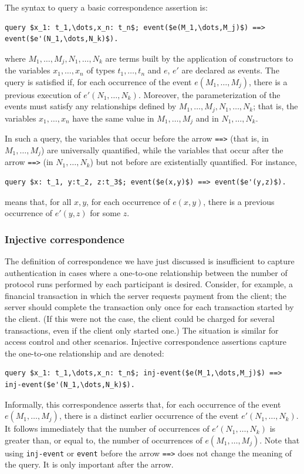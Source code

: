 \documentclass{book}
\begin{document}
The syntax to query a basic correspondence assertion is:
%
\begin{lstlisting}[numbers=none]
	query $x_1: t_1,\dots,x_n: t_n$; event($e(M_1,\dots,M_j)$) ==> event($e'(N_1,\dots,N_k)$).
\end{lstlisting}
%
where $M_1,\ldots,M_j,N_1,\ldots,N_k$ are terms built by the application of constructors to the variables $x_1,\allowbreak \ldots,\allowbreak x_n$ of types $t_1,\ldots,t_n$ and $e$, $e'$ are declared as events. The query is satisfied if, for each occurrence of the event $e(M_1,\dots,M_j)$, there is a previous execution of $e'(N_1,\dots,N_k)$. Moreover, the parameterization of the events must satisfy any relationships defined by $M_1,\dots,\allowbreak M_j,\allowbreak N_1,\dots,\allowbreak N_k$; that is, the variables $x_1, \ldots, x_n$ have the same value in $M_1,\dots,M_j$ and in $N_1,\dots,N_k$.

In such a query, the variables that occur before the arrow \lstinline!==>! (that is, in $M_1, \ldots, M_j$) are universally quantified, while the variables that occur after the arrow \lstinline!==>! (in $N_1, \ldots, N_k$) but not before are existentially quantified. For instance,
\begin{lstlisting}[numbers=none]
	query $x: t_1, y:t_2, z:t_3$; event($e(x,y)$) ==> event($e'(y,z)$).
\end{lstlisting}
means that, for all $x,y$, for each occurrence of $e(x,y)$, there is a previous occurrence of $e'(y,z)$ for some $z$.

\subsubsection{Injective correspondence}

The definition of correspondence we have just discussed is insufficient to capture authentication in cases where a one-to-one relationship between the number of protocol runs performed by each participant is desired. Consider, for example, a financial transaction in which the server requests payment from the client; the server should complete the transaction only once for each transaction started by the client. (If this were not the case, the client could be charged for several transactions, even if the client only started one.) The situation is similar for access control and other scenarios.
Injective correspondence assertions capture the one-to-one relationship and are denoted:
%
\begin{lstlisting}[numbers=none]
	query $x_1: t_1,\dots,x_n: t_n$; inj-event($e(M_1,\dots,M_j)$) ==> inj-event($e'(N_1,\dots,N_k)$).
\end{lstlisting}
%
Informally, this correspondence asserts that, for each occurrence of the event $e(M_1,\dots,M_j)$, there is a distinct earlier occurrence of the event $e'(N_1,\dots,N_k)$. It follows immediately that the number of occurrences of $e'(N_1,\dots,N_k)$ is greater than, or equal to, the number of occurrences of $e(M_1,\dots,M_j)$. Note that using \lstinline!inj-event! or \lstinline!event! before the arrow \lstinline!==>! does not change the meaning of the query. It is only important after the arrow.
\end{document}
